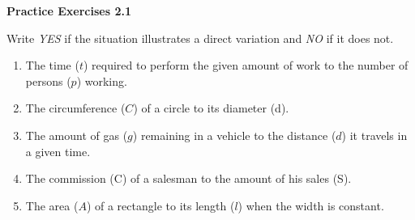\vspace{0.3ex}
\noindent\textbf{Practice Exercises 2.1}

\vspace{0.2ex}

Write \emph{YES} if the situation illustrates a direct variation and \emph{NO} if it does not.

\begin{enumerate}[noitemsep, label = \color{blue}\arabic*. ]
   \item The time ($t$) required to perform the given amount of work to the number of persons ($p$) working.
   \item The circumference ($C$) of a circle to its diameter (d).

   \item The amount of gas ($g$) remaining in a vehicle to the distance ($d$) it travels in a given time.
   \item The commission (C) of a salesman to the amount of his sales
   (S). 
   \item The area ($A$) of a rectangle to its length ($l$) when the width is constant.
\end{enumerate}
				
				

